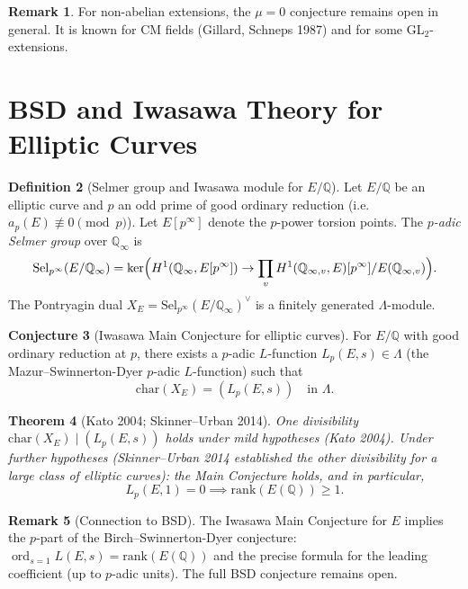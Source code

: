\documentclass[12pt,a4paper]{amsart}
\newtheorem{theorem}{Theorem}[section]
\theoremstyle{definition}
\newtheorem{definition}[theorem]{Definition}
\newtheorem{remark}[theorem]{Remark}
\newtheorem{conjecture}[theorem]{Conjecture}
\newcommand{\Q}{\mathbb{Q}}
\DeclareMathOperator{\ord}{ord}
\begin{document}
\begin{remark}
For non-abelian extensions, the $\mu = 0$ conjecture remains open in general.
It is known for CM fields (Gillard, Schneps 1987) and for some GL$_2$-extensions.
\end{remark}

\section{BSD and Iwasawa Theory for Elliptic Curves}

\begin{definition}[Selmer group and Iwasawa module for $E/\Q$]
\label{def:selmer_iwasawa}
Let $E/\Q$ be an elliptic curve and $p$ an odd prime of good ordinary
reduction (i.e.\ $a_p(E) \not\equiv 0 \pmod{p}$).  Let $E[p^\infty]$
denote the $p$-power torsion points.  The \emph{$p$-adic Selmer group}
over $\Q_\infty$ is
\[
  \mathrm{Sel}_{p^\infty}(E/\Q_\infty)
  = \ker\Bigl(H^1(\Q_\infty, E[p^\infty]) \to
    \prod_v H^1(\Q_{\infty,v}, E)[p^\infty]/E(\Q_{\infty,v})\Bigr).
\]
The Pontryagin dual $X_E = \mathrm{Sel}_{p^\infty}(E/\Q_\infty)^\vee$
is a finitely generated $\Lambda$-module.
\end{definition}

\begin{conjecture}[Iwasawa Main Conjecture for elliptic curves]
\label{conj:ec_main}
For $E/\Q$ with good ordinary reduction at $p$, there exists a
$p$-adic $L$-function $L_p(E, s) \in \Lambda$ (the Mazur--Swinnerton-Dyer
$p$-adic $L$-function) such that
\[
  \mathrm{char}(X_E) = (L_p(E, s)) \quad \text{in } \Lambda.
\]
\end{conjecture}

\begin{theorem}[Kato 2004; Skinner--Urban 2014]
\label{thm:kato_su}
One divisibility $\mathrm{char}(X_E) \mid (L_p(E, s))$ holds under mild
hypotheses (Kato 2004).  Under further hypotheses (Skinner--Urban 2014
established the other divisibility for a large class of elliptic curves):
the Main Conjecture holds, and in particular,
\[
  L_p(E, 1) = 0 \implies \mathrm{rank}(E(\Q)) \ge 1.
\]
\end{theorem}

\begin{remark}[Connection to BSD]
The Iwasawa Main Conjecture for $E$ implies the $p$-part of the
Birch--Swinnerton-Dyer conjecture: $\ord_{s=1} L(E,s) = \mathrm{rank}(E(\Q))$
and the precise formula for the leading coefficient (up to $p$-adic units).
The full BSD conjecture remains open.
\end{remark}
\end{document}
